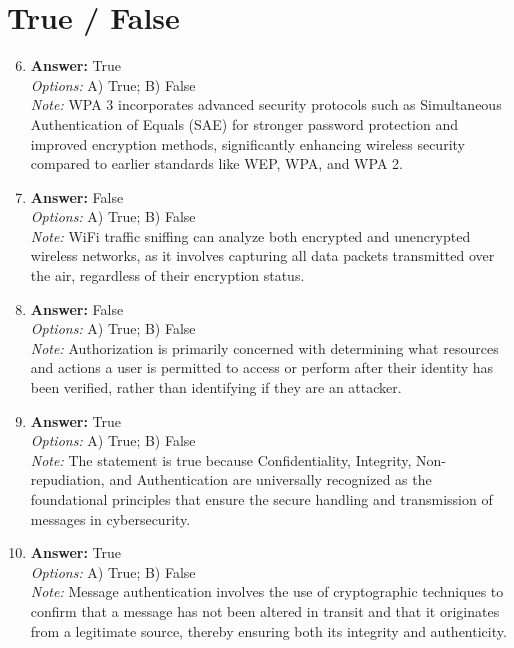 \documentclass[12pt]{article}
\begin{document}
\section*{True / False}
\begin{enumerate}[label=\arabic*.]
\setcounter{enumi}{5}
\item \textbf{Answer:} True
\\ \textit{Options:} A) True; B) False
\\ \textit{Note:} WPA 3 incorporates advanced security protocols such as Simultaneous Authentication of Equals (SAE) for stronger password protection and improved encryption methods, significantly enhancing wireless security compared to earlier standards like WEP, WPA, and WPA 2.
\item \textbf{Answer:} False
\\ \textit{Options:} A) True; B) False
\\ \textit{Note:} WiFi traffic sniffing can analyze both encrypted and unencrypted wireless networks, as it involves capturing all data packets transmitted over the air, regardless of their encryption status.
\item \textbf{Answer:} False
\\ \textit{Options:} A) True; B) False
\\ \textit{Note:} Authorization is primarily concerned with determining what resources and actions a user is permitted to access or perform after their identity has been verified, rather than identifying if they are an attacker.
\item \textbf{Answer:} True
\\ \textit{Options:} A) True; B) False
\\ \textit{Note:} The statement is true because Confidentiality, Integrity, Non-repudiation, and Authentication are universally recognized as the foundational principles that ensure the secure handling and transmission of messages in cybersecurity.
\item \textbf{Answer:} True
\\ \textit{Options:} A) True; B) False
\\ \textit{Note:} Message authentication involves the use of cryptographic techniques to confirm that a message has not been altered in transit and that it originates from a legitimate source, thereby ensuring both its integrity and authenticity.
\end{enumerate}
\end{document}
